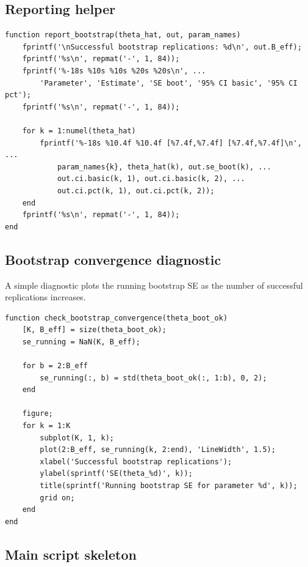 \documentclass[11pt]{article}
\begin{document}
\subsection{Reporting helper}

\begin{lstlisting}
function report_bootstrap(theta_hat, out, param_names)
    fprintf('\nSuccessful bootstrap replications: %d\n', out.B_eff);
    fprintf('%s\n', repmat('-', 1, 84));
    fprintf('%-18s %10s %10s %20s %20s\n', ...
        'Parameter', 'Estimate', 'SE boot', '95% CI basic', '95% CI pct');
    fprintf('%s\n', repmat('-', 1, 84));

    for k = 1:numel(theta_hat)
        fprintf('%-18s %10.4f %10.4f [%7.4f,%7.4f] [%7.4f,%7.4f]\n', ...
            param_names{k}, theta_hat(k), out.se_boot(k), ...
            out.ci.basic(k, 1), out.ci.basic(k, 2), ...
            out.ci.pct(k, 1), out.ci.pct(k, 2));
    end
    fprintf('%s\n', repmat('-', 1, 84));
end
\end{lstlisting}

\subsection{Bootstrap convergence diagnostic}

A simple diagnostic plots the running bootstrap SE as the number of successful
replications increases.

\begin{lstlisting}
function check_bootstrap_convergence(theta_boot_ok)
    [K, B_eff] = size(theta_boot_ok);
    se_running = NaN(K, B_eff);

    for b = 2:B_eff
        se_running(:, b) = std(theta_boot_ok(:, 1:b), 0, 2);
    end

    figure;
    for k = 1:K
        subplot(K, 1, k);
        plot(2:B_eff, se_running(k, 2:end), 'LineWidth', 1.5);
        xlabel('Successful bootstrap replications');
        ylabel(sprintf('SE(theta_%d)', k));
        title(sprintf('Running bootstrap SE for parameter %d', k));
        grid on;
    end
end
\end{lstlisting}

\subsection{Main script skeleton}
\end{document}
